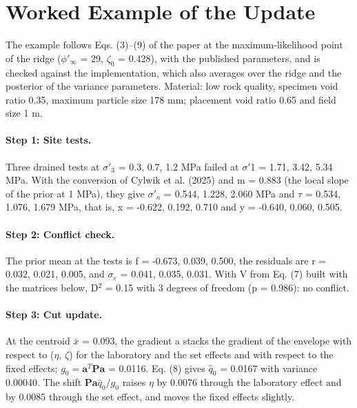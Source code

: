 \documentclass[Journal,letterpaper,InsideFigs,NoLists,NoLineNumbers]{ascelike-new}
\begin{document}
\section*{Worked Example of the Update}
The example follows Eqs. (3)--(9) of the paper at the maximum-likelihood point of the ridge ($\phi'_\infty$ = 29\textdegree{}, $\zeta_0$ = 0.428), with the published parameters, and is checked against the implementation, which also averages over the ridge and the posterior of the variance parameters. Material: low rock quality, specimen void ratio 0.35, maximum particle size 178 mm; placement void ratio 0.65 and field size 1 m.

\paragraph{Step 1: Site tests.}
Three drained tests at $\sigma'_3$ = 0.3, 0.7, 1.2 MPa failed at $\sigma'$1 = 1.71, 3.42, 5.34 MPa. With the conversion of Cylwik et al. (2025) and m = 0.883 (the local slope of the prior at 1 MPa), they give $\sigma'_n$ = 0.544, 1.228, 2.060 MPa and $\tau$ = 0.534, 1.076, 1.679 MPa, that is, x = -0.622, 0.192, 0.710 and y = -0.640, 0.060, 0.505.

\paragraph{Step 2: Conflict check.}
The prior mean at the tests is f = -0.673, 0.039, 0.500, the residuals are r = 0.032, 0.021, 0.005, and $\sigma_\varepsilon$ = 0.041, 0.035, 0.031. With V from Eq. (7) built with the matrices below, D$^{2}$ = 0.15 with 3 degrees of freedom (p = 0.986): no conflict.

\paragraph{Step 3: Cut update.}
At the centroid $\bar{x}$ = 0.093, the gradient a stacks the gradient of the envelope with respect to ($\eta$, $\zeta$) for the laboratory and the set effects and with respect to the fixed effects; $g_0=\mathbf{a}^T\mathbf{P}\mathbf{a}$ = 0.0116. Eq. (8) gives $\hat q_0$ = 0.0167 with variance 0.00040. The shift $\mathbf{P}\mathbf{a}\hat q_0/g_0$ raises $\eta$ by 0.0076 through the laboratory effect and by 0.0085 through the set effect, and moves the fixed effects slightly.
\end{document}
